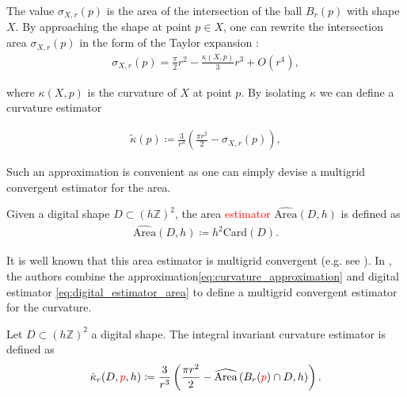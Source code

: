 \documentclass[smallextended]{svjour3}       %
\newcommand{\revision}[1]{\textcolor{red}{#1}}
\begin{document}
The value $\sigma_{X,r}(p)$ is the area of the intersection of the
ball $B_r(p)$ with shape $X$. By approaching the shape at
point $p \in X$, one can rewrite the intersection area
$\sigma_{X,r}(p)$ in the form of the Taylor expansion
\cite{pottman09intinvariant}:
\begin{align*}
  \sigma_{X,r}(p) = \frac{\pi}{2}r^2 - \frac{\kappa(X,p)}{3}r^3 + O(r^4),
\end{align*}
		
where $\kappa(X,p)$ is the curvature of $X$ at point $p$. By isolating $\kappa$ we can define a curvature estimator
	
\begin{align}
  \tilde{\kappa}(p) \coloneqq \frac{3}{r^3}\left( \frac{\pi r^2}{2} - \sigma_{X,r}(p) \right),
  \label{eq:curvature_approximation}
\end{align}
	
Such an approximation is convenient as one can simply devise a multigrid convergent estimator for the area.

\begin{definition}	
  Given a digital shape $D \subset (h \mathbb{Z})^2$,  the area \revision{estimator} $\widehat{\text{Area}}(D,h)$ is defined as	
  \begin{align}
    \widehat{\text{Area}}(D,h) \coloneqq h^2\text{Card}\left( D \right).	
    \label{eq:digital_estimator_area}
  \end{align}
\end{definition}
It is well known that this area estimator is multigrid convergent
(e.g. see \cite{klette2000multigrid}).  In
\cite{coeurjolly13integral}, the authors combine the
approximation\eqref{eq:curvature_approximation} and digital estimator
\eqref{eq:digital_estimator_area} to define a multigrid convergent
estimator for the curvature.

\begin{definition}
  Let $D \subset (h \mathbb{Z})^2$ a digital shape. The integral invariant curvature estimator is defined as
  \begin{align*}
    \hat{\kappa}_{r}(D,\revision{p},h) \coloneqq \frac{3}{r^3} \left( \frac{\pi r^2}{2} - \widehat{\text{Area}} \left( B_{r} ( \revision{p} ) \cap D, h \right) \right).
  \end{align*}
\end{definition}
\end{document}
